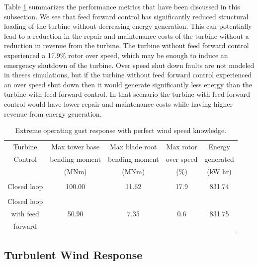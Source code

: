 Table \ref{Table3-1} summarizes the performance metrics that have been discussed in this subsection. We see that feed forward control has significantly reduced structural loading of the turbine without decreasing energy generation. This can potentially lead to a reduction in the repair and maintenance costs of the turbine without a reduction in revenue from the turbine. The turbine without feed forward control experienced a 17.9$\%$ rotor over speed, which may be enough to induce an emergency shutdown of the turbine. Over speed shut down faults are not modeled in theses simulations, but if the turbine without feed forward control experienced an over speed shut down then it would generate significantly less energy than the turbine with feed forward control. In that scenario the turbine with feed forward control would have lower repair and maintenance costs while having higher revenue from energy generation.

\begin{table}
\caption{Extreme operating gust response with perfect wind speed knowledge.}
\centering
\begin{tabular}{ c | c c c c }
\hline
\hline
Turbine			& Max tower	base		& Max blade	root		& Max rotor				& Energy\\
Control			& bending moment		& bending moment		& over speed					& generated\\
					& (MNm)  				& (MNm)				& ($\%$)	& (kW hr)\\
\hline
  &  &   &  &  \\
Closed loop  & 100.00 & 11.62  &17.9 & 831.74 \\
 &  &   &  & \\
Closed loop  &  &   &  &  \\
with feed  & 50.90 & 7.35  & 0.6 & 831.75 \\
forward  &  &   &  &  \\
\hline
\hline
\end{tabular}
\label{Table3-1}
\end{table}

\subsection{Turbulent Wind Response} \label{section3-4-2}

